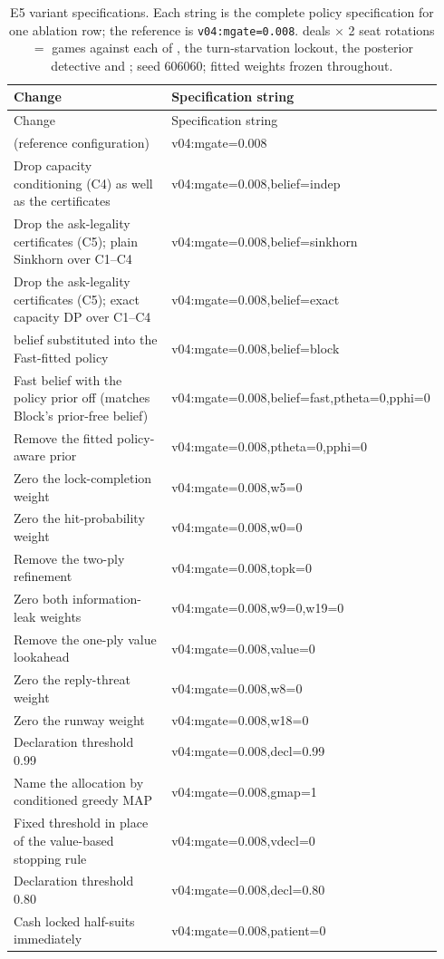 \begin{longtable}{@{}>{\footnotesize}p{0.42\linewidth}>{\footnotesize\ttfamily}p{0.52\linewidth}@{}}
\caption{E5 variant specifications. Each string is the complete policy
specification for one ablation row; the reference is
\texttt{v04:mgate=0.008}. \numAblDeals{} deals $\times$ 2 seat rotations
$=$ \numAblGames{} games against each of \vthree{}, the turn-starvation
lockout, the posterior detective and \vtwo{}; seed 606060; fitted weights
frozen throughout.}
\label{tab:ablspecs}\\
\toprule
\normalfont Change & \normalfont Specification string \\
\midrule
\endfirsthead
\toprule
\normalfont Change & \normalfont Specification string \\
\midrule
\endhead
\vfast{} (reference configuration) & v04:mgate=0.008 \\
\addlinespace
Drop capacity conditioning (C4) as well as the certificates & v04:mgate=0.008,belief=indep \\
Drop the ask-legality certificates (C5); plain Sinkhorn over C1--C4 & v04:mgate=0.008,belief=sinkhorn \\
Drop the ask-legality certificates (C5); exact capacity DP over C1--C4 & v04:mgate=0.008,belief=exact \\
\vblock{} belief substituted into the Fast-fitted policy & v04:mgate=0.008,belief=block \\
Fast belief with the policy prior off (matches Block's prior-free belief) & v04:mgate=0.008,belief=fast,ptheta=0,pphi=0 \\
Remove the fitted policy-aware prior & v04:mgate=0.008,ptheta=0,pphi=0 \\
\addlinespace
Zero the lock-completion weight & v04:mgate=0.008,w5=0 \\
Zero the hit-probability weight & v04:mgate=0.008,w0=0 \\
Remove the two-ply refinement & v04:mgate=0.008,topk=0 \\
Zero both information-leak weights & v04:mgate=0.008,w9=0,w19=0 \\
Remove the one-ply value lookahead & v04:mgate=0.008,value=0 \\
Zero the reply-threat weight & v04:mgate=0.008,w8=0 \\
Zero the runway weight & v04:mgate=0.008,w18=0 \\
\addlinespace
Declaration threshold 0.99 & v04:mgate=0.008,decl=0.99 \\
Name the allocation by conditioned greedy MAP & v04:mgate=0.008,gmap=1 \\
Fixed threshold in place of the value-based stopping rule & v04:mgate=0.008,vdecl=0 \\
Declaration threshold 0.80 & v04:mgate=0.008,decl=0.80 \\
Cash locked half-suits immediately & v04:mgate=0.008,patient=0 \\
\bottomrule
\end{longtable}

